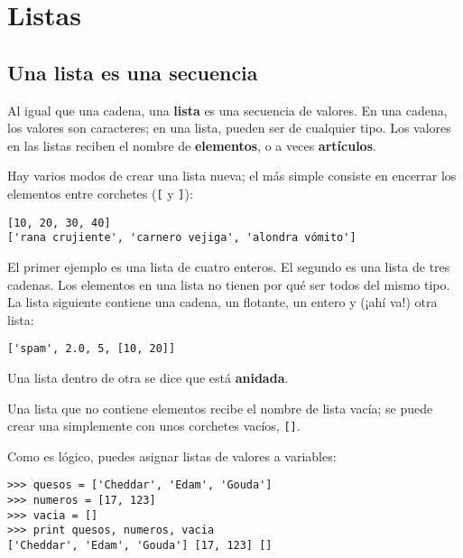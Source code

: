 
\chapter{Listas}



\section{Una lista es una secuencia}

Al igual que una cadena, una {\bf lista} es una secuencia de valores. En una cadena, los
valores son caracteres; en una lista, pueden ser de cualquier tipo. Los valores en las
listas reciben el nombre de {\bf elementos}, o a veces {\bf artículos}.


Hay varios modos de crear una lista nueva; el más simple
consiste en encerrar los elementos entre corchetes (\verb"[" y \verb"]"):

\beforeverb
\begin{verbatim}
[10, 20, 30, 40]
['rana crujiente', 'carnero vejiga', 'alondra vómito']
\end{verbatim}
\afterverb
%
El primer ejemplo es una lista de cuatro enteros. El segundo es una lista
de tres cadenas. Los elementos en una lista no tienen por qué ser todos del mismo tipo.
La lista siguiente contiene una cadena, un flotante, un entero y
(¡ahí va!) otra lista:

\beforeverb
\begin{verbatim}
['spam', 2.0, 5, [10, 20]]
\end{verbatim}
\afterverb
%
Una lista dentro de otra se dice que está {\bf anidada}.


Una lista que no contiene elementos recibe el nombre
de lista vacía; se puede crear una simplemente
con unos corchetes vacíos, \verb"[]".


Como es lógico, puedes asignar listas de valores a variables:

\beforeverb
\begin{verbatim}
>>> quesos = ['Cheddar', 'Edam', 'Gouda']
>>> numeros = [17, 123]
>>> vacia = []
>>> print quesos, numeros, vacia
['Cheddar', 'Edam', 'Gouda'] [17, 123] []
\end{verbatim}
\afterverb
%


